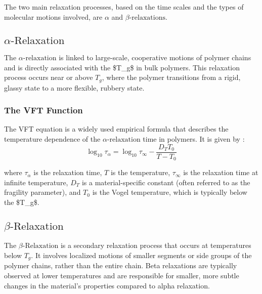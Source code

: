  The two main relaxation processes, based on the time scales and the types of molecular motions involved, are $\alpha$ and $\beta\text{-relaxations}$.

\subsection{$\alpha\text{-Relaxation}$}


The \(\alpha\text{-relaxation}\) is linked to large-scale, cooperative motions of polymer chains and is directly associated with the \ac{$T_g$} in bulk polymers. This relaxation process occurs near or above \(T_g\), where the polymer transitions from a rigid, glassy state to a more flexible, rubbery state. %

\subsubsection{The VFT Function}

The \ac{VFT} equation is a widely used empirical formula that describes the temperature dependence of the $\alpha\text{-relaxation}$ time in polymers. It is given by \cite{levit2019}:
\begin{equation}
\label{vfteq}
\log_{10} \tau_\alpha = \log_{10} \tau_\infty - \frac{D_T T_0}{T - T_0}
\end{equation}

where $\tau_\alpha$ is the relaxation time, $T$ is the temperature, $\tau_\infty$ is the relaxation time at infinite temperature, $D_T$ is a material-specific constant (often referred to as the fragility parameter), and $T_0$ is the Vogel temperature, which is typically below the \ac{$T_g$}.

\subsection{$\beta\text{-Relaxation}$}

The $\beta\text{-Relaxation}$ is a secondary relaxation process that occurs at temperatures below \(T_g\). It involves localized motions of smaller segments or side groups of the polymer chains, rather than the entire chain. Beta relaxations are typically observed at lower temperatures and are responsible for smaller, more subtle changes in the material's properties compared to alpha relaxation.
